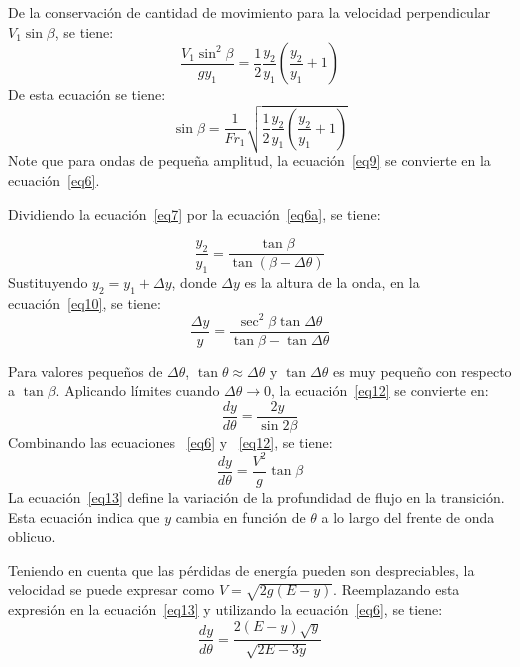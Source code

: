 \documentclass[11pt, oneside]{article}
\begin{document}
De la conservaci\'on de cantidad de movimiento para la velocidad perpendicular $V_1 \sin \beta$, se tiene:
\begin{equation}
    \frac{V_1 \sin^2 \beta}{gy_1} = \frac{1}{2}\frac{y_2}{y_1}\left( \frac{y_2}{y_1} + 1 \right)
    \label{eq8}
\end{equation}
De esta ecuaci\'on se tiene:
\begin{equation}
    \sin \beta = \frac{1}{Fr_1}\sqrt{\frac{1}{2}\frac{y_2}{y_1}\left( \frac{y_2}{y_1} + 1 \right)}
    \label{eq9}
\end{equation}
Note que para ondas de pequeña amplitud, la ecuaci\'on~\ref{eq9} se convierte en la ecuaci\'on~\ref{eq6}.

Dividiendo la ecuaci\'on~\ref{eq7} por la ecuaci\'on~\ref{eq6a}, se tiene:

\begin{equation}
    \frac{y_2}{y_1} = \frac{\tan \beta}{\tan \left(\beta-\Delta \theta \right)}
    \label{eq10}
\end{equation}
Sustituyendo $y_2 = y_1 + \Delta y$, donde $\Delta y$ es la altura de la onda, en la ecuaci\'on~\ref{eq10}, se tiene:
\begin{equation}
    \frac{\Delta y}{y} = \frac{\sec^2 \beta \tan \Delta \theta}{\tan \beta - \tan \Delta \theta}
    \label{eq11}
\end{equation}

Para valores pequeños de $\Delta \theta$, $\tan \theta \approx \Delta \theta$ y $\tan \Delta \theta$ es muy pequeño con respecto a $\tan \beta$. Aplicando l\'imites cuando $\Delta \theta \rightarrow 0$, la ecuaci\'on~\ref{eq12} se convierte en:
\begin{equation}
    \frac{dy}{d\theta} = \frac{2y}{\sin 2\beta}
    \label{eq12}
\end{equation}
Combinando las ecuaciones ~\ref{eq6} y ~\ref{eq12}, se tiene:
\begin{equation}
    \frac{dy}{d\theta} = \frac{V^2}{g}\tan \beta
    \label{eq13}
\end{equation}
La ecuaci\'on~\ref{eq13} define la variaci\'on de la profundidad de flujo en la transici\'on. Esta ecuaci\'on indica que $y$ cambia en funci\'on de $\theta$ a lo largo del frente de onda oblicuo.

Teniendo en cuenta que las p\'erdidas de energ\'ia pueden son despreciables, la velocidad se puede expresar como $V = \sqrt{2g\left(E-y\right)}$. Reemplazando esta expresi\'on en la ecuaci\'on~\ref{eq13} y utilizando la ecuaci\'on~\ref{eq6}, se tiene:
\begin{equation}
    \frac{dy}{d\theta} = \frac{2\left(E-y\right)\sqrt{y}}{\sqrt{2E-3y}}
    \label{eq14}
\end{equation}
\end{document}
